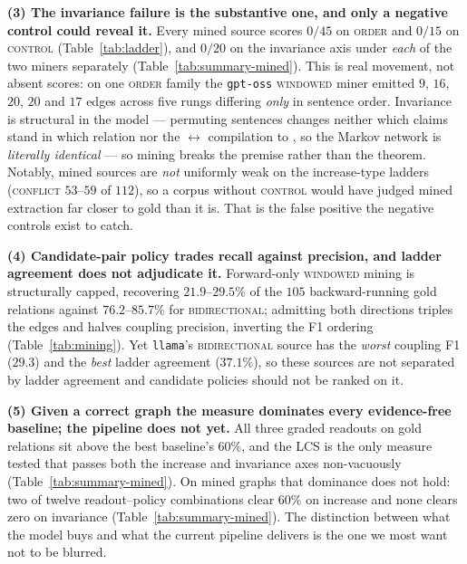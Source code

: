 \textbf{(3) The invariance failure is the substantive one, and only a negative control could reveal it.} Every
mined source scores $0/45$ on \textsc{order} and $0/15$ on \textsc{control} (Table~\ref{tab:ladder}), and
$0/20$ on the invariance axis under \emph{each} of the two miners separately (Table~\ref{tab:summary-mined}). This is real movement, not absent scores: on one
\textsc{order} family the \texttt{gpt-oss} \textsc{windowed} miner emitted $9$, $16$, $20$, $20$ and $17$ edges
across five rungs differing \emph{only} in sentence order. Invariance is structural in the model --- permuting
sentences changes neither which claims stand in which relation nor the
$\leftrightarrow$ compilation to , so the Markov network is
\emph{literally identical} --- so mining breaks the premise rather than the theorem. Notably, mined sources are
\emph{not} uniformly weak on the increase-type ladders (\textsc{conflict} $53$--$59$ of $112$), so a corpus
without \textsc{control} would have judged mined extraction far closer to gold than it is. That is the false
positive the negative controls exist to catch.

\textbf{(4) Candidate-pair policy trades recall against precision, and ladder agreement does not adjudicate it.}
Forward-only \textsc{windowed} mining is structurally capped, recovering $21.9$--$29.5\%$ of the $105$
backward-running gold relations against $76.2$--$85.7\%$ for \textsc{bidirectional}; admitting both directions
triples the edges and halves coupling precision, inverting the F1 ordering (Table~\ref{tab:mining}). Yet
\texttt{llama}'s \textsc{bidirectional} source has the \emph{worst} coupling F1 ($29.3$) and the \emph{best} ladder
agreement ($37.1\%$), so these sources are not separated by ladder agreement and candidate policies should not be
ranked on it.

\textbf{(5) Given a correct graph the measure dominates every evidence-free baseline; the pipeline does not yet.}
All three graded readouts on gold relations sit above the best baseline's $60\%$, and the LCS is the only measure
tested that passes both the increase and invariance axes non-vacuously (Table~\ref{tab:summary-mined}). On mined graphs
that dominance does not hold: two of twelve readout--policy combinations clear $60\%$ on increase and none clears
zero on invariance (Table~\ref{tab:summary-mined}). The distinction between what the model buys and what the
current pipeline delivers is the one we most want not to be blurred.

